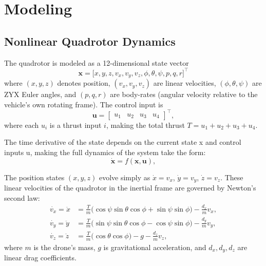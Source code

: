 \documentclass[11pt]{amsart}
\begin{document}
\section{\textbf{Modeling}}

 
\subsection{Nonlinear Quadrotor Dynamics}

The quadrotor is modeled as a 12-dimensional state vector
\[
\mathbf{x} = \bigl[\! x, y, z, v_x, v_y, v_z, \phi, \theta, \psi, p, q, r \!\bigr]^\top
\]
where $(x, y, z)$ denotes position, $(v_x, v_y, v_z)$ are linear velocities,
$(\phi, \theta, \psi)$ are ZYX Euler angles, and $(p, q, r)$ are body-rates (angular velocity relative to the vehicle's own rotating frame).
The control input is
\[
\mathbf{u} = \begin{bmatrix} u_1 & u_2 & u_3 & u_4 \end{bmatrix}^\top,
\]
where each $u_i$ is a thrust input $i$, making the total thrust $T = u_1 + u_2 + u_3 + u_4$.

The time derivative of the state depends on the current state x and control inputs u, making the full dynamics of the system take the form:
\[
\dot{\mathbf{x}} = f(\mathbf{x}, \mathbf{u}),
\]

The position states $(x, y, z)$ evolve simply as $\dot{x} = v_x$, $\dot{y} = v_y$, 
$\dot{z} = v_z$. 
These linear velocities of the quadrotor in the inertial frame are governed by Newton’s second law:
\begin{align*}
\dot{v_x} = \ddot{x} &= \frac{T}{m}\bigl(\cos\psi\sin\theta\cos\phi + \sin\psi\sin\phi\bigr) - \frac{d_x}{m}v_x, \\
\dot{v_y} = \ddot{y} &= \frac{T}{m}\bigl(\sin\psi\sin\theta\cos\phi - \cos\psi\sin\phi\bigr) - \frac{d_y}{m}v_y, \\
\dot{v_z} = \ddot{z} &= \frac{T}{m}\bigl(\cos\theta\cos\phi\bigr) - g - \frac{d_z}{m}v_z,
\end{align*}
where $m$ is the drone's mass, $g$ is gravitational acceleration, and $d_x, d_y, d_z$ are linear drag coefficients.
\end{document}
